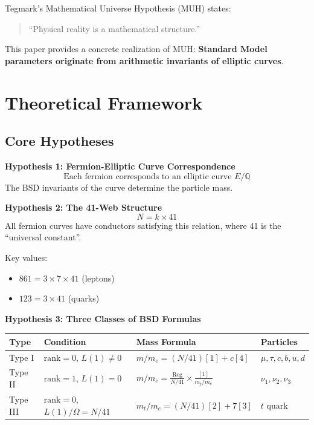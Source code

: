 ﻿\documentclass[11pt,a4paper]{article}
\begin{document}
Tegmark's Mathematical Universe Hypothesis (MUH) states:
\begin{quote}
``Physical reality is a mathematical structure.''
\end{quote}

This paper provides a concrete realization of MUH: \textbf{Standard Model parameters originate from arithmetic invariants of elliptic curves}.

\section{Theoretical Framework}

\subsection{Core Hypotheses}

\textbf{Hypothesis 1: Fermion-Elliptic Curve Correspondence}
\begin{equation}
    \text{Each fermion corresponds to an elliptic curve } E/\mathbb{Q}
\end{equation}
The BSD invariants of the curve determine the particle mass.

\textbf{Hypothesis 2: The 41-Web Structure}
\begin{equation}
    N = k \times 41
\end{equation}
All fermion curves have conductors satisfying this relation, where 41 is the ``universal constant''.

Key values:
\begin{itemize}
    \item $861 = 3 \times 7 \times 41$ (leptons)
    \item $123 = 3 \times 41$ (quarks)
\end{itemize}

\textbf{Hypothesis 3: Three Classes of BSD Formulas}

\begin{table}[h]
\centering
\begin{tabular}{@{}llll@{}}
\toprule
\textbf{Type} & \textbf{Condition} & \textbf{Mass Formula} & \textbf{Particles} \\
\midrule
Type I & $\text{rank}=0$, $L(1) \neq 0$ & $m/m_e = (N/41)[1] + c[4]$ & $\mu, \tau, c, b, u, d$ \\
Type II & $\text{rank}=1$, $L(1)=0$ & $m/m_e = \frac{\text{Reg}}{N/41} \times \frac{[1]}{m_t/m_e}$ & $\nu_1, \nu_2, \nu_3$ \\
Type III & $\text{rank}=0$, $L(1)/\Omega=N/41$ & $m_t/m_e = (N/41)[2] + 7[3]$ & $t$ quark \\
\bottomrule
\end{tabular}
\end{table}
\end{document}

